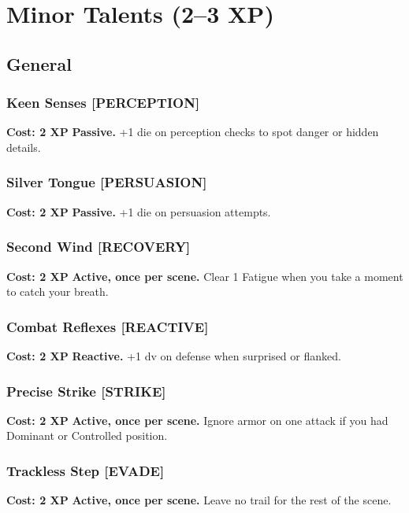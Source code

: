 \section{Minor Talents (2--3 XP)}
\label{sec:minor-talents}

\subsection*{General}
\label{sec:minor-general}

\subsubsection*{Keen Senses \textnormal{[PERCEPTION]}}
\label{talent:keen-senses}
\textbf{Cost: 2 XP} \textbf{Passive.} +1 die on perception checks to spot danger or hidden details.

\subsubsection*{Silver Tongue \textnormal{[PERSUASION]}}
\label{talent:silver-tongue}
\textbf{Cost: 2 XP} \textbf{Passive.} +1 die on persuasion attempts.

\subsubsection*{Second Wind \textnormal{[RECOVERY]}}
\label{talent:second-wind}
\textbf{Cost: 2 XP} \textbf{Active, once per scene.} Clear 1 Fatigue when you take a moment to catch your breath.

\subsubsection*{Combat Reflexes \textnormal{[REACTIVE]}}
\label{talent:combat-reflexes}
\textbf{Cost: 2 XP} \textbf{Reactive.} +1 dv on defense when surprised or flanked.

\subsubsection*{Precise Strike \textnormal{[STRIKE]}}
\label{talent:precise-strike}
\textbf{Cost: 2 XP} \textbf{Active, once per scene.} Ignore armor on one attack if you had Dominant or Controlled position.

\subsubsection*{Trackless Step \textnormal{[EVADE]}}
\label{talent:trackless-step}
\textbf{Cost: 2 XP} \textbf{Active, once per scene.} Leave no trail for the rest of the scene.

